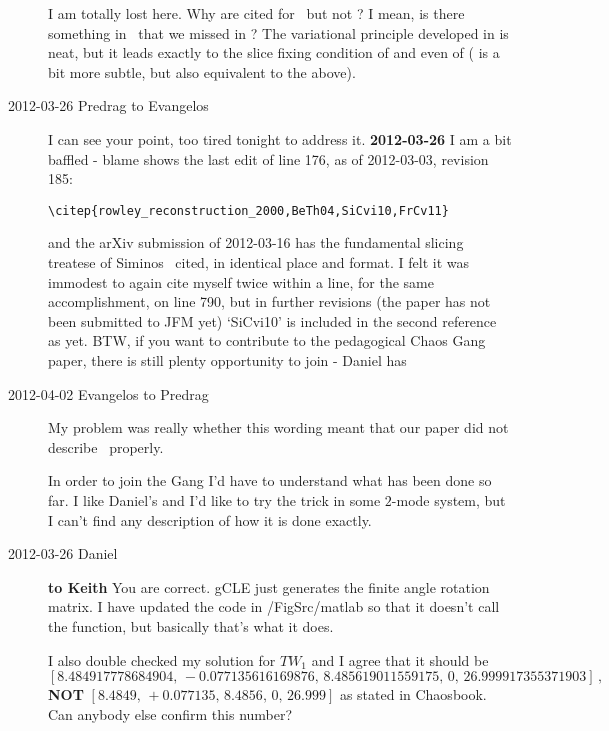 \begin{description}
I am totally lost here. Why are
\citep{rowley_reconstruction_2000,BeTh04,FrCv11} cited for \mslices\ but
not ? I mean, is there something in \mslices\ that we
missed in ? The variational principle developed in
 is neat, but it leads exactly to the slice fixing
condition of \citep{rowley_reconstruction_2000,SiCvi10} and even of
 ( is a bit more subtle, but also
equivalent to the above).

\item[2012-03-26 Predrag to Evangelos] I can see your point, too
    tired tonight to address it.
{\bf 2012-03-26} I am a bit baffled - blame shows the last edit of line 176, as of
2012-03-03, revision 185:
\begin{verbatim}
\citep{rowley_reconstruction_2000,BeTh04,SiCvi10,FrCv11}
\end{verbatim}
and the arXiv submission of 2012-03-16 has the fundamental
slicing treatese of Siminos \etal\ cited, in identical place and format. I
felt it was immodest to again cite myself twice within a line, for the same
accomplishment, on line 790, but in further revisions (the paper has not been submitted to JFM yet)
`SiCvi10' is included in the second reference as yet. BTW, if you want to contribute
to the pedagogical Chaos Gang paper, there is still plenty opportunity to join - Daniel has

\item[2012-04-02 Evangelos to Predrag] My problem was really whether this 
wording meant that our paper did not describe \mslices\ properly.

In order to join the Gang I'd have to understand what has been done so far. 
I like Daniel's  and I'd like to try the trick in some $2$-mode system, but
I can't find any description of how it is done exactly. 

\item[2012-03-26 Daniel] {\bf to Keith}  You are correct. gCLE just
generates the finite angle rotation matrix. I have updated the code in
/FigSrc/matlab so that it doesn't call the function, but basically that's
what it does.

I also double checked my solution for $TW_1$ and I agree that it should be
\[
[8.484917778684904, \,-0.077135616169876,\,8.485619011559175,\,0,\,26.999917355371903]
\,,
\]
{\bf NOT} $[8.4849,\,+0.077135,\,8.4856,\,0,\,26.999]$ as stated in
 Chaosbook. Can anybody else confirm this number?                       \toCB


\end{description}
